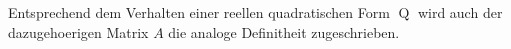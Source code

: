 Entsprechend dem Verhalten einer reellen quadratischen Form $\operatorname{Q}$ wird auch der dazugehoerigen Matrix $A$ die analoge Definitheit zugeschrieben.
